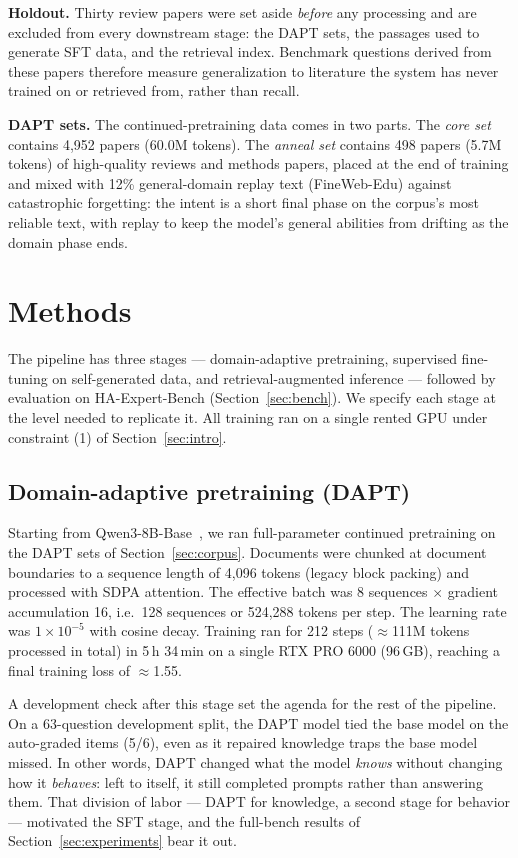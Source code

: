 \documentclass[11pt]{article}
\begin{document}
\textbf{Holdout.} Thirty review papers were set aside \emph{before} any
processing and are excluded from every downstream stage: the DAPT sets,
the passages used to generate SFT data, and the retrieval index.
Benchmark questions derived from these papers therefore measure
generalization to literature the system has never trained on or retrieved
from, rather than recall.

\textbf{DAPT sets.} The continued-pretraining data comes in two parts.
The \emph{core set} contains 4,952 papers (60.0M tokens). The
\emph{anneal set} contains 498 papers (5.7M tokens) of high-quality
reviews and methods papers, placed at the end of training and mixed with
12\% general-domain replay text (FineWeb-Edu) against catastrophic
forgetting: the intent is a short final phase on the corpus's most
reliable text, with replay to keep the model's general abilities from
drifting as the domain phase ends.

\section{Methods}
\label{sec:methods}

The pipeline has three stages --- domain-adaptive pretraining, supervised
fine-tuning on self-generated data, and retrieval-augmented inference ---
followed by evaluation on HA-Expert-Bench (Section~\ref{sec:bench}). We
specify each stage at the level needed to replicate it. All training ran
on a single rented GPU under constraint (1) of Section~\ref{sec:intro}.

\subsection{Domain-adaptive pretraining (DAPT)}
\label{sec:dapt}

Starting from Qwen3-8B-Base~\cite{qwen3}, we ran full-parameter continued
pretraining on the DAPT sets of Section~\ref{sec:corpus}. Documents were
chunked at document boundaries to a sequence length of 4,096 tokens
(legacy block packing) and processed with SDPA attention. The effective
batch was 8 sequences $\times$ gradient accumulation 16, i.e.\ 128
sequences or 524,288 tokens per step. The learning rate was
$1\times10^{-5}$ with cosine decay. Training ran for 212 steps
($\approx$111M tokens processed in total) in 5\,h 34\,min on a single
RTX PRO 6000 (96\,GB), reaching a final training loss of $\approx$1.55.

A development check after this stage set the agenda for the rest of the
pipeline. On a 63-question development split, the DAPT model tied the base
model on the auto-graded items (5/6), even as it repaired knowledge traps
the base model missed. In other words, DAPT changed what the model
\emph{knows} without changing how it \emph{behaves}: left to itself, it
still completed prompts rather than answering them. That division of labor
--- DAPT for knowledge, a second stage for behavior --- motivated the SFT
stage, and the full-bench results of Section~\ref{sec:experiments} bear
it out.
\end{document}
